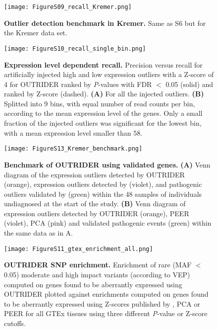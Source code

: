 \documentclass[a4paper,12pt]{article}
\begin{document}
\begin{figure}[h]
    \centering
    \texttt{[image: FigureS09\_recall\_Kremer.png]}
    \caption{\textbf{Outlier detection benchmark in Kremer.}
    Same as S6 but for the Kremer data set.}
\end{figure}
\pagebreak


\begin{figure}[h]
    \centering
    \texttt{[image: FigureS10\_recall\_single\_bin.png]}
    \caption{\textbf{Expression level dependent recall.} 
Precision versus recall for artificially injected high and low expression outliers with a Z-score of 4 for OUTRIDER ranked by \textit{P}-values with FDR $<$ 0.05 (solid) and ranked by Z-score (dashed).
\textbf{(A)} For all the injected outliers. \textbf{(B)} Splitted into 9 bins, 
with equal number of read counts per bin, according to the mean expression level of the genes. Only a small fraction of the injected outliers was significant for the lowest bin, with a mean expression level smaller than 58.}
\end{figure}
\pagebreak


\begin{figure}[h]
    \centering
    \texttt{[image: FigureS13\_Kremer\_benchmark.png]}
    \caption{\textbf{Benchmark of OUTRIDER using validated genes.} 
\textbf{(A)} Venn diagram of the expression outliers detected by OUTRIDER (orange), expression outliers detected by \citeauthor{Kremer2017} (violet), and pathogenic outliers validated by \citeauthor{Kremer2017} (green) within the 48 samples of individuals undiagnosed at the start of the  \citeauthor{Kremer2017}  study\cite{Kremer2017}. \textbf{(B)} Venn diagram of expression outliers detected by OUTRIDER (orange), PEER (violet), PCA (pink) and validated pathogenic events (green) within the same data as in A.}
\end{figure}
\pagebreak



\begin{figure}[h]
    \centering
    \texttt{[image: FigureS11\_gtex\_enrichment\_all.png]}
    \caption{\textbf{OUTRIDER SNP enrichment.} 
Enrichment of rare (MAF $<$ 0.05) moderate and high impact variants (according to VEP) computed on genes found to be aberrantly expressed using OUTRIDER plotted against enrichments computed on genes found to be aberrantly expressed using Z-scores published by \citet{Li2017}, PCA or PEER for all GTEx tissues using three different \textit{P}-value or Z-score cutoffs.}
\end{figure}
\pagebreak
\end{document}
